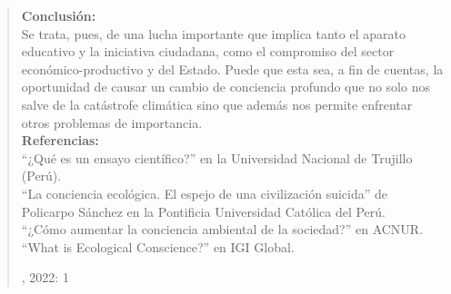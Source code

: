 \documentclass[a4paper,man,natbib]{apa6}
\begin{document}
\begin{quote}
{        \textbf{Conclusión:}\\
        Se trata, pues, de una lucha importante que implica tanto el aparato educativo y la iniciativa ciudadana, como el compromiso del sector económico-productivo y del Estado. Puede que esta sea, a fin de cuentas, la oportunidad de causar un cambio de conciencia profundo que no solo nos salve de la catástrofe climática sino que además nos permite enfrentar otros problemas de importancia.\\
        \textbf{Referencias:}\\
        “¿Qué es un ensayo científico?” en la Universidad Nacional de Trujillo (Perú).\\
        “La conciencia ecológica. El espejo de una civilización suicida” de Policarpo Sánchez en la Pontificia Universidad Católica del Perú.\\
        “¿Cómo aumentar la conciencia ambiental de la sociedad?” en ACNUR.\\
        “What is Ecological Conscience?” en IGI Global.\\
    }
    \begin{flushright}
        \citeauthor{ensayoEjemplo}, 2022: 1
    \end{flushright}

\end{quote}



\end{document}
